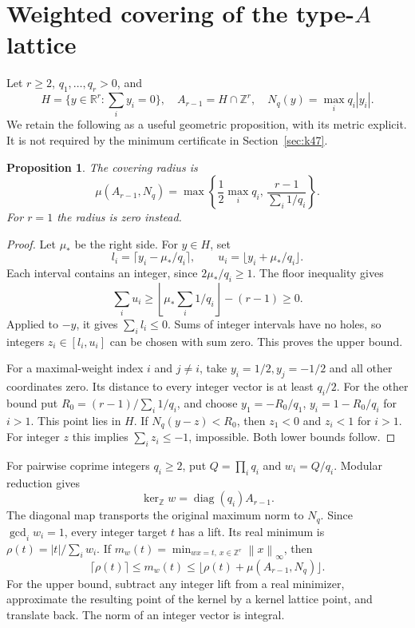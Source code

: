 \documentclass[11pt,a4paper]{article}
\newtheorem{proposition}[theorem]{Proposition}
\theoremstyle{definition}\newtheorem{question}[theorem]{Question}
\theoremstyle{remark}\newtheorem{remark}[theorem]{Remark}
\newcommand{\Z}{\mathbb Z}\newcommand{\R}{\mathbb R}
\newcommand{\norm}[1]{\left\lVert#1\right\rVert_\infty}
\begin{document}
\section{Weighted covering of the type-\texorpdfstring{\(A\)}{A} lattice}\label{app:radius}
Let \(r\ge2\), \(q_1,\ldots,q_r>0\), and
\[
 H=\{y\in\R^r:\textstyle\sum_i y_i=0\},\quad
 A_{r-1}=H\cap\Z^r,\quad N_q(y)=\max_i q_i|y_i|.
\]
We retain the following as a useful geometric proposition, with its metric
explicit. It is not required by the minimum certificate in Section~\ref{sec:k47}.

\begin{proposition}\label{prop:radius}
The covering radius is
\begin{equation}\label{eq:radius}
 \mu(A_{r-1},N_q)=
 \max\left\{\frac12\max_iq_i,\,
                 \frac{r-1}{\sum_i1/q_i}\right\}.
\end{equation}
For \(r=1\) the radius is zero instead.
\end{proposition}
\begin{proof}
Let \(\mu_*\) be the right side. For \(y\in H\), set
\[
 l_i=\lceil y_i-\mu_*/q_i\rceil,\qquad
 u_i=\lfloor y_i+\mu_*/q_i\rfloor.
\]
Each interval contains an integer, since \(2\mu_*/q_i\ge1\).
The floor inequality gives
\[
 \sum_i u_i\ge
 \left\lfloor\mu_*\sum_i1/q_i\right\rfloor-(r-1)\ge0.
\]
Applied to \(-y\), it gives \(\sum_i l_i\le0\).
Sums of integer intervals have no holes, so integers
\(z_i\in[l_i,u_i]\) can be chosen with sum zero. This proves the upper bound.

For a maximal-weight index \(i\) and \(j\ne i\), take
\(y_i=1/2,y_j=-1/2\) and all other coordinates zero.
Its distance to every integer vector is at least \(q_i/2\).
For the other bound put \(R_0=(r-1)/\sum_i1/q_i\), and choose
\(y_1=-R_0/q_1\), \(y_i=1-R_0/q_i\) for \(i>1\).
This point lies in \(H\). If \(N_q(y-z)<R_0\), then
\(z_1<0\) and \(z_i<1\) for \(i>1\).
For integer \(z\) this implies \(\sum_i z_i\le-1\), impossible.
Both lower bounds follow.
\end{proof}

For pairwise coprime integers \(q_i\ge2\), put \(Q=\prod_iq_i\) and
\(w_i=Q/q_i\). Modular reduction gives
\[
 \ker_{\Z}w=\operatorname{diag}(q_i)A_{r-1}.
\]
The diagonal map transports the original maximum norm to \(N_q\).
Since \(\gcd_i w_i=1\), every integer target \(t\) has a lift.
Its real minimum is \(\rho(t)=|t|/\sum_i w_i\).
If \(m_w(t)=\min_{w x=t,\ x\in\Z^r}\norm{x}\), then
\begin{equation}\label{eq:lift-radius}
 \lceil\rho(t)\rceil\le m_w(t)\le
 \lfloor\rho(t)+\mu(A_{r-1},N_q)\rfloor.
\end{equation}
For the upper bound, subtract any integer lift from a real minimizer,
approximate the resulting point of the kernel by a kernel lattice point,
and translate back. The norm of an integer vector is integral.
\end{document}
